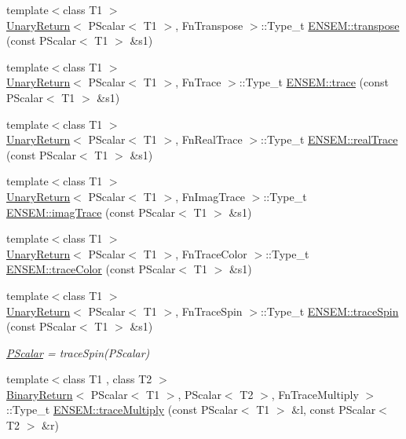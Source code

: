 \begin{DoxyCompactItemize}
{\footnotesize template$<$class T1 $>$ }\\\mbox{\hyperlink{structUnaryReturn}{Unary\+Return}}$<$ P\+Scalar$<$ T1 $>$, Fn\+Transpose $>$\+::Type\+\_\+t \mbox{\hyperlink{group__primscalar_gafa9e84efffc0a6f10d97120033276f1c}{E\+N\+S\+E\+M\+::transpose}} (const P\+Scalar$<$ T1 $>$ \&s1)
\item 
{\footnotesize template$<$class T1 $>$ }\\\mbox{\hyperlink{structUnaryReturn}{Unary\+Return}}$<$ P\+Scalar$<$ T1 $>$, Fn\+Trace $>$\+::Type\+\_\+t \mbox{\hyperlink{group__primscalar_ga13a07d573bfefc0db7496d278c078a52}{E\+N\+S\+E\+M\+::trace}} (const P\+Scalar$<$ T1 $>$ \&s1)
\item 
{\footnotesize template$<$class T1 $>$ }\\\mbox{\hyperlink{structUnaryReturn}{Unary\+Return}}$<$ P\+Scalar$<$ T1 $>$, Fn\+Real\+Trace $>$\+::Type\+\_\+t \mbox{\hyperlink{group__primscalar_ga63efc63157b5fc9495798f0391c8e170}{E\+N\+S\+E\+M\+::real\+Trace}} (const P\+Scalar$<$ T1 $>$ \&s1)
\item 
{\footnotesize template$<$class T1 $>$ }\\\mbox{\hyperlink{structUnaryReturn}{Unary\+Return}}$<$ P\+Scalar$<$ T1 $>$, Fn\+Imag\+Trace $>$\+::Type\+\_\+t \mbox{\hyperlink{group__primscalar_gaf760659a12c2bd7668440d8b83333086}{E\+N\+S\+E\+M\+::imag\+Trace}} (const P\+Scalar$<$ T1 $>$ \&s1)
\item 
{\footnotesize template$<$class T1 $>$ }\\\mbox{\hyperlink{structUnaryReturn}{Unary\+Return}}$<$ P\+Scalar$<$ T1 $>$, Fn\+Trace\+Color $>$\+::Type\+\_\+t \mbox{\hyperlink{group__primscalar_gaf9f8817942b8ea7583ac7146ede1508f}{E\+N\+S\+E\+M\+::trace\+Color}} (const P\+Scalar$<$ T1 $>$ \&s1)
\item 
{\footnotesize template$<$class T1 $>$ }\\\mbox{\hyperlink{structUnaryReturn}{Unary\+Return}}$<$ P\+Scalar$<$ T1 $>$, Fn\+Trace\+Spin $>$\+::Type\+\_\+t \mbox{\hyperlink{group__primscalar_gacb9de2d99f632eb0d424014a2afbdef7}{E\+N\+S\+E\+M\+::trace\+Spin}} (const P\+Scalar$<$ T1 $>$ \&s1)
\begin{DoxyCompactList}\small\item\em \mbox{\hyperlink{classENSEM_1_1PScalar}{P\+Scalar}} = trace\+Spin(\+P\+Scalar) \end{DoxyCompactList}\item 
{\footnotesize template$<$class T1 , class T2 $>$ }\\\mbox{\hyperlink{structBinaryReturn}{Binary\+Return}}$<$ P\+Scalar$<$ T1 $>$, P\+Scalar$<$ T2 $>$, Fn\+Trace\+Multiply $>$\+::Type\+\_\+t \mbox{\hyperlink{group__primscalar_gafbab702f52c534882636a524d002b106}{E\+N\+S\+E\+M\+::trace\+Multiply}} (const P\+Scalar$<$ T1 $>$ \&l, const P\+Scalar$<$ T2 $>$ \&r)

\end{DoxyCompactItemize}
